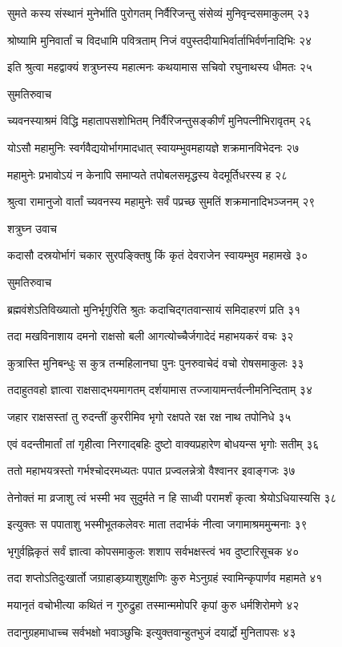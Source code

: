 सुमते कस्य संस्थानं मुनेर्भाति पुरोगतम्
निर्वैरिजन्तु संसेव्यं मुनिवृन्दसमाकुलम् २३

श्रोष्यामि मुनिवार्तां च विदधामि पवित्रताम्
निजं वपुस्तदीयाभिर्वार्ताभिर्वर्णनादिभिः २४

इति श्रुत्वा महद्वाक्यं शत्रुघ्नस्य महात्मनः
कथयामास सचिवो रघुनाथस्य धीमतः २५

सुमतिरुवाच

च्यवनस्याश्रमं विद्धि महातापसशोभितम्
निर्वैरिजन्तुसङ्कीर्णं मुनिपत्नीभिरावृतम् २६

योऽसौ महामुनिः स्वर्गवैद्ययोर्भागमादधात्
स्वायम्भुवमहायज्ञे शक्रमानविभेदनः २७

महामुनेः प्रभावोऽयं न केनापि समाप्यते
तपोबलसमृद्धस्य वेदमूर्तिधरस्य ह २८

श्रुत्वा रामानुजो वार्तां च्यवनस्य महामुनेः
सर्वं पप्रच्छ सुमतिं शक्रमानादिभञ्जनम् २९

शत्रुघ्न उवाच

कदासौ दस्रयोर्भागं चकार सुरपङ्क्तिषु
किं कृतं देवराजेन स्वायम्भुव महामखे ३०

सुमतिरुवाच

ब्रह्मवंशेऽतिविख्यातो मुनिर्भृगुरिति श्रुतः
कदाचिद्गतवान्सायं समिदाहरणं प्रति ३१

तदा मखविनाशाय दमनो राक्षसो बली
आगत्योच्चैर्जगादेदं महाभयकरं वचः ३२

कुत्रास्ति मुनिबन्धुः स कुत्र तन्महिलानघा
पुनः पुनरुवाचेदं वचो रोषसमाकुलः ३३

तदाहुतवहो ज्ञात्वा राक्षसाद्भयमागतम्
दर्शयामास तज्जायामन्तर्वत्नीमनिन्दिताम् ३४

जहार राक्षसस्तां तु रुदन्तीं कुररीमिव
भृगो रक्षपते रक्ष रक्ष नाथ तपोनिधे ३५

एवं वदन्तीमार्तां तां गृहीत्वा निरगाद्बहिः
दुष्टो वाक्यप्रहारेण बोधयन्स भृगोः सतीम् ३६

ततो महाभयत्रस्तो गर्भश्चोदरमध्यतः
पपात प्रज्वलन्नेत्रो वैश्वानर इवाङ्गजः ३७

तेनोक्तं मा व्रजाशु त्वं भस्मी भव सुदुर्मते
न हि साध्वी परामर्शं कृत्वा श्रेयोऽधियास्यसि ३८

इत्युक्तः स पपाताशु भस्मीभूतकलेवरः
माता तदार्भकं नीत्वा जगामाश्रममुन्मनाः ३९

भृगुर्वह्निकृतं सर्वं ज्ञात्वा कोपसमाकुलः
शशाप सर्वभक्षस्त्वं भव दुष्टारिसूचक ४०

तदा शप्तोऽतिदुःखार्तो जग्राहाङ्घ्र्याशुशुक्षणिः
कुरु मेऽनुग्रहं स्वामिन्कृपार्णव महामते ४१

मयानृतं वचोभीत्या कथितं न गुरुद्रुहा
तस्मान्ममोपरि कृपां कुरु धर्मशिरोमणे ४२

तदानुग्रहमाधाच्च सर्वभक्षो भवाञ्छुचिः
इत्युक्तवान्हुतभुजं दयार्द्रो मुनितापसः ४३

